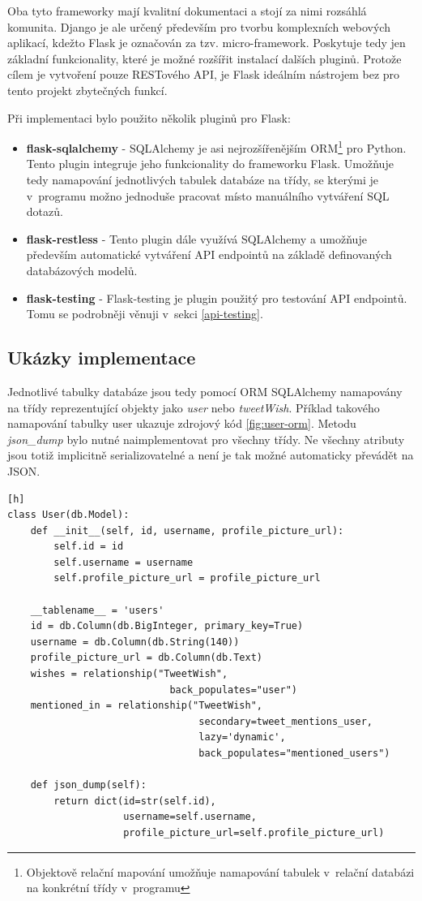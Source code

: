 \documentclass[thesis=B,czech]{FITthesis}[2012/06/26]
\begin{document}
	Oba tyto frameworky mají kvalitní dokumentaci a stojí za nimi rozsáhlá komunita. Django je ale určený především pro tvorbu komplexních webových aplikací, kdežto Flask je označován za tzv. micro-framework. Poskytuje tedy jen základní funkcionality, které je možné rozšířit instalací dalších pluginů. Protože cílem je vytvoření pouze RESTového API, je Flask ideálním nástrojem bez pro tento projekt zbytečných funkcí. 
	
\noindent Při implementaci bylo použito několik pluginů pro Flask:
	
\begin{itemize}
\item \textbf{flask-sqlalchemy} - SQLAlchemy je asi nejrozšířenějším ORM\footnote{Objektově relační mapování umožňuje namapování tabulek v~relační databázi na konkrétní třídy v~programu} pro Python. Tento plugin integruje jeho funkcionality do frameworku Flask. Umožňuje tedy namapování jednotlivých tabulek databáze na třídy, se kterými je v~programu možno jednoduše pracovat místo manuálního vytváření SQL dotazů. 
\item \textbf{flask-restless} - Tento plugin dále využívá SQLAlchemy a umožňuje především automatické vytváření API endpointů na základě definovaných databázových modelů. 
\item \textbf{flask-testing} - Flask-testing je plugin použitý pro testování API endpointů. Tomu se podrobněji věnuji v~sekci \ref{api-testing}.
\end{itemize}

\subsection{Ukázky implementace}
Jednotlivé tabulky databáze jsou tedy pomocí ORM SQLAlchemy namapovány na třídy reprezentující objekty jako \textit{user} nebo \textit{tweetWish}. Příklad takového namapování tabulky user ukazuje zdrojový kód \ref{fig:user-orm}. Metodu \textit{json\_dump} bylo nutné naimplementovat pro všechny třídy. Ne všechny atributy jsou totiž implicitně serializovatelné a není je tak možné automaticky převádět na JSON. 

\begin{lstlisting}[caption={Ukázka použití ORM SQLAlchemy},label=fig:user-orm][h]
class User(db.Model):
	def __init__(self, id, username, profile_picture_url):
		self.id = id
		self.username = username
		self.profile_picture_url = profile_picture_url

	__tablename__ = 'users'
	id = db.Column(db.BigInteger, primary_key=True)
	username = db.Column(db.String(140))
	profile_picture_url = db.Column(db.Text)
	wishes = relationship("TweetWish",
							back_populates="user")
	mentioned_in = relationship("TweetWish",
    							 secondary=tweet_mentions_user,
								 lazy='dynamic',
								 back_populates="mentioned_users")

	def json_dump(self):
		return dict(id=str(self.id),
					username=self.username,
					profile_picture_url=self.profile_picture_url)
\end{lstlisting}
\end{document}
